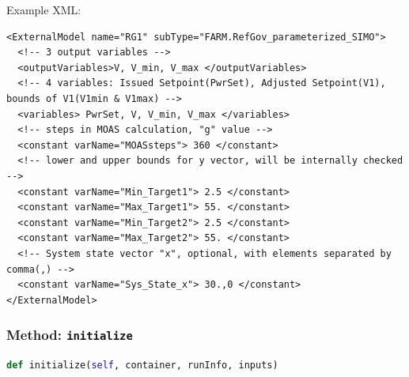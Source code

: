 Example XML:
\begin{lstlisting}[style=XML,morekeywords={subType,ModuleToLoad}]
  <ExternalModel name="RG1" subType="FARM.RefGov_parameterized_SIMO">
  <!-- 3 output variables -->
  <outputVariables>V, V_min, V_max </outputVariables>
  <!-- 4 variables: Issued Setpoint(PwrSet), Adjusted Setpoint(V1), bounds of V1(V1min & V1max) -->
  <variables> PwrSet, V, V_min, V_max </variables>
  <!-- steps in MOAS calculation, "g" value -->
  <constant varName="MOASsteps"> 360 </constant>
  <!-- lower and upper bounds for y vector, will be internally checked -->
  <constant varName="Min_Target1"> 2.5 </constant>
  <constant varName="Max_Target1"> 55. </constant>
  <constant varName="Min_Target2"> 2.5 </constant>
  <constant varName="Max_Target2"> 55. </constant>
  <!-- System state vector "x", optional, with elements separated by comma(,) -->
  <constant varName="Sys_State_x"> 30.,0 </constant>
</ExternalModel>
\end{lstlisting}

\subsubsection{Method: \texttt{initialize}}
\label{subsubsec:externalInitializeExternalModelPlugin}
\begin{lstlisting}[language=python]
def initialize(self, container, runInfo, inputs)
\end{lstlisting}

